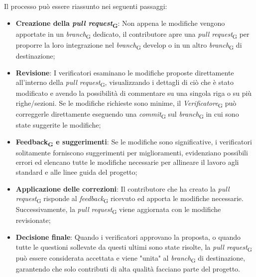 Il processo può essere riassunto nei seguenti passaggi:
\begin{itemize}
    \item \textbf{Creazione della \textit{pull request}\textsubscript{G}}: Non appena le modifiche vengono apportate in un \textit{branch}\textsubscript{G} dedicato, il contributore apre una \textit{pull request}\textsubscript{G} per proporre la loro integrazione nel \textit{branch}\textsubscript{G} develop o in un altro \textit{branch}\textsubscript{G} di destinazione;
    \item \textbf{Revisione}: I verificatori esaminano le modifiche proposte direttamente all'interno della \textit{pull request}\textsubscript{G}, visualizzando i dettagli di ciò che è stato modificato e avendo la possibilità di commentare su una singola riga o su più righe/sezioni. Se le modifiche richieste sono minime, il \textit{Verificatore}\textsubscript{G} può correggerle direttamente eseguendo una \textit{commit}\textsubscript{G} sul \textit{branch}\textsubscript{G} in cui sono state suggerite le modifiche;
    \item \textbf{Feedback\textsubscript{G} e suggerimenti}: Se le modifiche sono significative, i verificatori solitamente forniscono suggerimenti per miglioramenti, evidenziano possibili errori ed elencano tutte le modifiche necessarie per allineare il lavoro agli standard e alle linee guida del progetto;
    \item \textbf{Applicazione delle correzioni}: Il contributore che ha creato la \textit{pull request}\textsubscript{G} risponde al \textit{feedback}\textsubscript{G} ricevuto ed apporta le modifiche necessarie. Successivamente, la \textit{pull request}\textsubscript{G} viene aggiornata con le modifiche revisionate;
    \item \textbf{Decisione finale}: Quando i verificatori approvano la proposta, o quando tutte le questioni sollevate da questi ultimi sono state risolte, la \textit{pull request}\textsubscript{G} può essere considerata accettata e viene "unita" al \textit{branch}\textsubscript{G} di destinazione, garantendo che solo contributi di alta qualità facciano parte del progetto.
\end{itemize}
